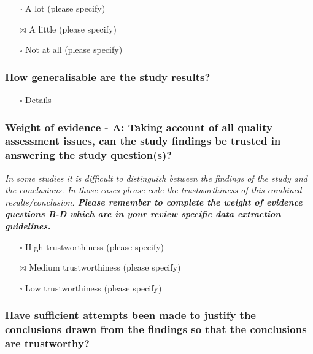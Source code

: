 \documentclass[
  doc, a4paper]{apa7}
\providecommand{\tightlist}{%
  \setlength{\itemsep}{0pt}\setlength{\parskip}{0pt}}
\begin{document}
\begin{itemize}
\tightlist
\item[$\square$]
  A lot (please specify)
\item[$\boxtimes$]
  A little (please specify)
\item[$\square$]
  Not at all (please specify)
\end{itemize}

\subsubsection{How generalisable are the study results?}\label{how-generalisable-are-the-study-results}

\begin{itemize}
\tightlist
\item[$\square$]
  Details
\end{itemize}

\subsubsection{Weight of evidence - A: Taking account of all quality assessment issues, can the study findings be trusted in answering the study question(s)?}\label{weight-of-evidence---a-taking-account-of-all-quality-assessment-issues-can-the-study-findings-be-trusted-in-answering-the-study-questions}

\emph{In some studies it is difficult to distinguish between the findings of the study and the conclusions. In those cases please code the trustworthiness of this combined results/conclusion.\textbf{ Please remember to complete the weight of evidence questions B-D which are in your review specific data extraction guidelines. }}

\begin{itemize}
\tightlist
\item[$\square$]
  High trustworthiness (please specify)
\item[$\boxtimes$]
  Medium trustworthiness (please specify)
\item[$\square$]
  Low trustworthiness (please specify)
\end{itemize}

\subsubsection{Have sufficient attempts been made to justify the conclusions drawn from the findings so that the conclusions are trustworthy?}\label{have-sufficient-attempts-been-made-to-justify-the-conclusions-drawn-from-the-findings-so-that-the-conclusions-are-trustworthy}
\end{document}
